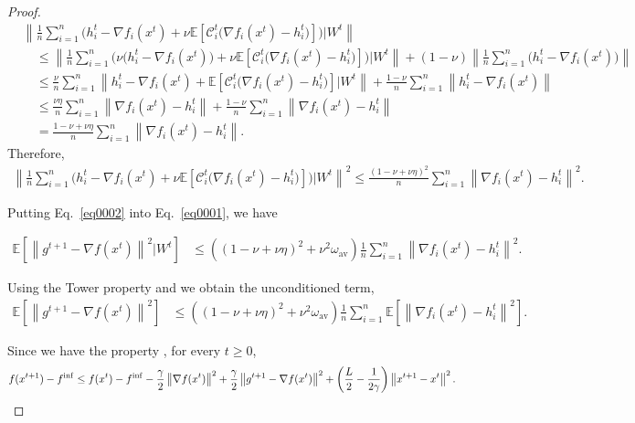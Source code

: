 \documentclass{article} %
\theoremstyle{plain}
\theoremstyle{definition}
\theoremstyle{remark}
\newcommand{\kai}[1]{\todo[inline]{{\textbf{Kai:} \emph{#1}}}}
\newcommand{\sqnorm}[1]{\left\| #1 \right\|^2}
\newcommand{\Exp}[1]{\mathbb{E}\!\left[ #1 \right]}
\newcommand{\oma}{\omega_{\mathrm{av}}}
\begin{document}
\begin{proof}
   \begin{equation}\label{eq0002}
   \begin{aligned}
      &\left\|\frac{1}{n}\sum_{i=1}^n \Big(h_i^{t}-\nabla f_i(x^t) +\nu \Exp{\mathcal{C}_i^t\big(\nabla f_i(x^t)-h_i^t\big)} \Big) | W^t\right\|\\
      &\quad \leq \left\|\frac{1}{n}\sum_{i=1}^n \Big(\nu\big(h_i^{t}-\nabla f_i(x^t)\big) +\nu \Exp{\mathcal{C}_i^t\big(\nabla f_i(x^t)-h_i^t\big)} \Big) | W^t\right\| + (1-\nu)\left\|\frac{1}{n}\sum_{i=1}^n \big(h_i^{t}-\nabla f_i(x^t)\big)\right\|\\
      &\quad \leq \frac{\nu}{n}\sum_{i=1}^n\left\|h_i^{t}-\nabla f_i(x^t)+ \Exp{\mathcal{C}_i^t\big(\nabla f_i(x^t)-h_i^t\big)} | W^t\right\| + \frac{1-\nu}{n}\sum_{i=1}^n \left\|h_i^{t}-\nabla f_i(x^t)\right\|\\
      &\quad \leq  \frac{\nu\eta}{n}\sum_{i=1}^n \left\|\nabla f_i(x^t)-h_i^{t}\right\|+ \frac{1-\nu}{n}\sum_{i=1}^n \left\|\nabla f_i(x^t)-h_i^{t}\right\|\\
      & \quad = \frac{1-\nu+\nu\eta}{n}\sum_{i=1}^n \left\|\nabla f_i(x^t)-h_i^{t}\right\|.
   \end{aligned}
   \end{equation}
   Therefore, 
   \begin{align*}
   \sqnorm{\frac{1}{n}\sum_{i=1}^n \Big(h_i^{t}-\nabla f_i(x^t) +\nu \Exp{\mathcal{C}_i^t\big(\nabla f_i(x^t)-h_i^t\big)} \Big) | W^t} \leq \frac{(1-\nu+\nu\eta)^2}{n}\sum_{i=1}^n \sqnorm{\nabla f_i(x^t)-h_i^{t}}.
   \end{align*}

   Putting Eq.~\ref{eq0002} into Eq.~\ref{eq0001}, we have 
   
   \begin{align*}
   \Exp{\sqnorm{g^{t+1}-\nabla f(x^t)}| W^t} &\leq 
   \left((1-\nu+\nu\eta)^2+\nu^2\oma\right)\frac{1}{n}\sum_{i=1}^n \sqnorm{\nabla f_i(x^t)-h_i^{t}}.
   \end{align*}

   Using the Tower property and we obtain the unconditioned term,
   \begin{align*}
      \Exp{\sqnorm{g^{t+1}-\nabla f(x^t)}} &\leq 
      \left((1-\nu+\nu\eta)^2+\nu^2\oma\right)\frac{1}{n}\sum_{i=1}^n \Exp{\sqnorm{\nabla f_i(x^t)-h_i^{t}}}.
      \end{align*}
    
   Since we have the property \citep[Lemma 4]{ric21}, for every $t\geq 0$,
   \begin{align}
   f(x^{t+1}) -f^{\inf} &\leq f(x^t)  -f^{\inf} -\frac{\gamma}{2} \sqnorm{\nabla f(x^t)} +\frac{ \gamma }{2}\sqnorm{g^{t+1}-\nabla f(x^t)} + \left(\frac{ L}{2}-\frac{1}{2\gamma}\right)\sqnorm{x^{t+1}-x^t}.\notag
   \end{align}


\end{proof}
\end{document}
